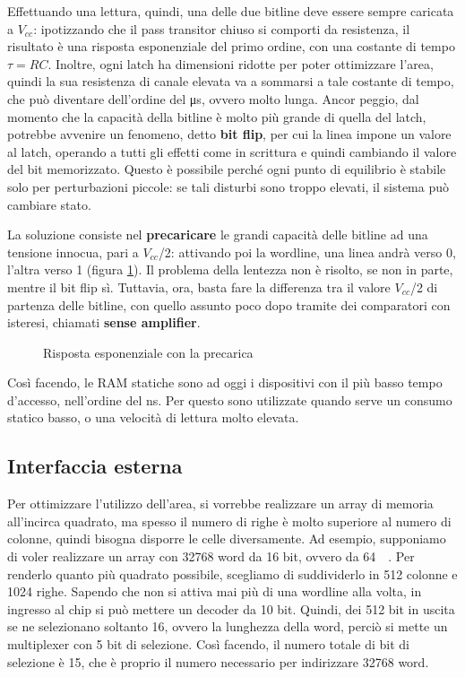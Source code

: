 \documentclass[11pt,4paper]{report}
\newcommand{\vcc}{$V_{cc}$}
\begin{document}
Effettuando una lettura, quindi, una delle due bitline deve essere sempre caricata a \vcc: ipotizzando che il pass transitor chiuso si comporti da resistenza, il risultato è una risposta esponenziale del primo ordine, con una costante di tempo $\tau = RC$. Inoltre, ogni latch ha dimensioni ridotte per poter ottimizzare l'area, quindi la sua resistenza di canale elevata va a sommarsi a tale costante di tempo, che può diventare dell'ordine del \si{\micro\second}, ovvero molto lunga. Ancor peggio, dal momento che la capacità della bitline è molto più grande di quella del latch, potrebbe avvenire un fenomeno, detto \textbf{bit flip}, per cui la linea impone un valore al latch, operando a tutti gli effetti come in scrittura e quindi cambiando il valore del bit memorizzato. Questo è possibile perché ogni punto di equilibrio è stabile solo per perturbazioni piccole: se tali disturbi sono troppo elevati, il sistema può cambiare stato.

La soluzione consiste nel \textbf{precaricare} le grandi capacità delle bitline ad una tensione innocua, pari a \vcc/2: attivando poi la wordline, una linea andrà verso 0, l'altra verso 1 (figura \ref{fig:precharge}). Il problema della lentezza non è risolto, se non in parte, mentre il bit flip sì. Tuttavia, ora, basta fare la differenza tra il valore \vcc/2 di partenza delle bitline, con quello assunto poco dopo tramite dei comparatori con isteresi, chiamati \textbf{sense amplifier}. 
\begin{figure}[hbtp]
	\centering
	
	\caption{Risposta esponenziale con la precarica}
	\label{fig:precharge}
\end{figure}


Così facendo, le RAM statiche sono ad oggi i dispositivi con il più basso tempo d'accesso, nell'ordine del \si{\nano\second}. Per questo sono utilizzate quando serve un consumo statico basso, o una velocità di lettura molto elevata.

\subsection{Interfaccia esterna}
Per ottimizzare l'utilizzo dell'area, si vorrebbe realizzare un array di memoria all'incirca quadrato, ma spesso il numero di righe è molto superiore al numero di colonne, quindi bisogna disporre le celle diversamente. Ad esempio, supponiamo di voler realizzare un array con 32768 word da 16 bit, ovvero da \SI{64}{\kilo\byte}. Per renderlo quanto più quadrato possibile, scegliamo di suddividerlo in 512 colonne e 1024 righe. Sapendo che non si attiva mai più di una wordline alla volta, in ingresso al chip si può mettere un decoder da 10 bit. Quindi, dei 512 bit in uscita se ne selezionano soltanto 16, ovvero la lunghezza della word, perciò si mette un multiplexer con 5 bit di selezione. Così facendo, il numero totale di bit di selezione è 15, che è proprio il numero necessario per indirizzare 32768 word.
\end{document}
